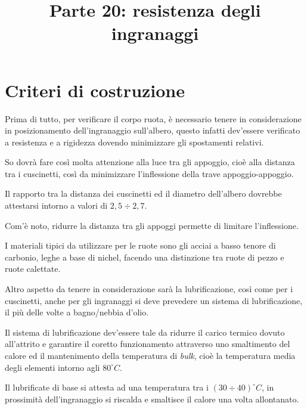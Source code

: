 \documentclass[a4paper, 15pt]{article}
\title{Parte 20: resistenza degli ingranaggi}
\date{}
\begin{document}
\maketitle
{}
\setcounter{tocdepth}{5}  %
\tableofcontents 
\newpage



\section{Criteri di costruzione}
\begin{adjustwidth}{2in}{}
Prima di tutto, per verificare il corpo ruota, è necessario tenere in considerazione in posizionamento dell'ingranaggio sull'albero, questo infatti dev'essere verificato a resistenza e a rigidezza dovendo minimizzare gli spostamenti relativi. 

So dovrà fare così molta attenzione alla luce tra gli appoggio, cioè alla distanza tra i cuscinetti, così da minimizzare l'inflessione della trave appoggio-appoggio. 

Il rapporto tra la distanza dei cuscinetti ed il diametro dell'albero dovrebbe attestarsi intorno a valori di $2,5\div2,7$. 

Com'è noto, ridurre la distanza tra gli appoggi permette di limitare l'inflessione. 	\newline 

I materiali tipici da utilizzare per le ruote sono gli acciai a basso tenore di carbonio, leghe a base di nichel, facendo una distinzione tra ruote di pezzo e ruote calettate. \newline 

Altro aspetto da tenere in considerazione sarà la lubrificazione, così come per i cuscinetti, anche per gli ingranaggi si deve prevedere un sistema di lubrificazione, il più delle volte a bagno/nebbia d'olio. 

Il sistema di lubrificazione dev'essere tale da ridurre il carico termico dovuto all'attrito e garantire il coretto funzionamento attraverso uno smaltimento del calore ed il mantenimento della temperatura di \textit{bulk}, cioè la temperatura media degli elementi  intorno agli $80^\circ C$. 

Il lubrificate di base si attesta ad una temperatura tra i $(30\div40)^\circ C$, in prossimità dell'ingranaggio si riscalda e smaltisce il calore una volta allontanato.\newline 


\end{adjustwidth}
\end{document}
